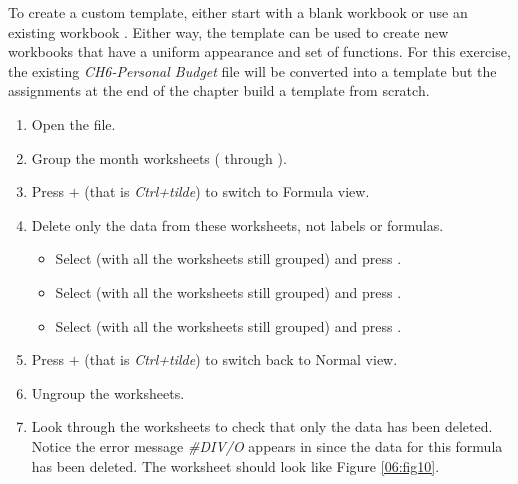 To create a custom template, either start with a blank workbook or use an existing workbook . Either way, the template can be used to create new workbooks that have a uniform appearance and set of functions. For this exercise, the existing \textit{CH6-Personal Budget} file will be converted into a template but the assignments at the end of the chapter build a template from scratch.

\begin{enumerate}
	\item Open the  file.
	\item Group the month worksheets ( through ).
	\item Press $+$\fmtKeystroke{$ \sim $} (that is \textit{Ctrl+tilde}) to switch to Formula view.
	\item Delete only the data from these worksheets, not labels or formulas. 

	\begin{itemize}
		\item Select  (with all the worksheets still grouped) and press .
		\item Select  (with all the worksheets still grouped) and press .
		\item Select  (with all the worksheets still grouped) and press .
	\end{itemize}	

\item Press $+$\fmtKeystroke{$ \sim $} (that is \textit{Ctrl+tilde}) to switch back to Normal view.
	\item Ungroup the worksheets. 
	\item Look through the worksheets to check that only the data has been deleted. Notice the error message \textit{\#DIV/O} appears in  since the data for this formula has been deleted. The  worksheet should look like Figure \ref{06:fig10}.
\end{enumerate}

